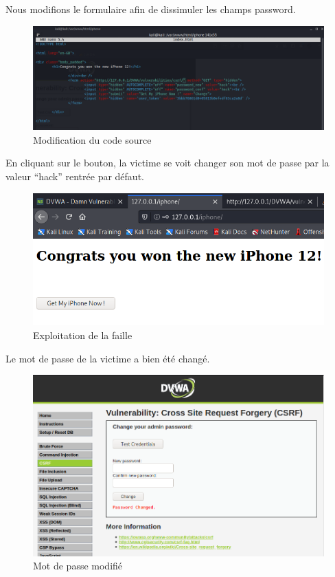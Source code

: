 \documentclass[12pt, oneside]{article}
\begin{document}
Nous modifions le formulaire afin de dissimuler les champs password.
\begin{figure}[H]
\centering
\includegraphics[scale=0.4]{19}
\caption{Modification du code source}
\end{figure}
En cliquant sur le bouton, la victime se voit changer son mot de passe par la valeur “hack” rentrée par défaut.
\begin{figure}[H]
\centering
\includegraphics[scale=0.4]{20}
\caption{Exploitation de la faille}
\end{figure}
Le mot de passe de la victime a bien été changé.
\begin{figure}[H]
\centering
\includegraphics[scale=0.4]{21}
\caption{Mot de passe modifié}
\end{figure}
\end{document}
